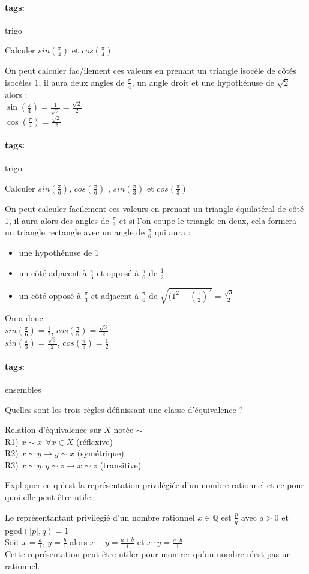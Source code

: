 \documentclass[12pt]{article}
\newcommand*{\xfield}[1]{\begin{mdframed}\centering #1\end{mdframed}\bigskip}
\newenvironment{note}{}{}
\newcommand*{\tags}[1]{\paragraph{tags: }#1}
\begin{document}
\begin{note}
	\tags{trigo}
	\xfield{Calculer $sin(\frac{\pi}{4})$ et $cos(\frac{\pi}{4})$}
	\xfield{On peut calculer fac/ilement ces valeurs en prenant un triangle isocèle de côtés isocèles 1, il aura deux angles de $\frac{\pi}{4}$, un angle droit et une hypothénuse de $\sqrt{2}$ alors : \\
	$\sin(\frac{\pi}{4}) = \frac{1}{\sqrt{2}} = \frac{\sqrt{2}}{2}$\\
	$\cos(\frac{\pi}{4}) = \frac{\sqrt{2}}{2}$}
\end{note}
\begin{note}
	\tags{trigo}
	\xfield{Calculer
$sin(\frac{\pi}{6})$,  $cos(\frac{\pi}{6})$ , $sin(\frac{\pi}{3})$ et $cos(\frac{\pi}{3})$}
	\xfield{On peut calculer facilement ces valeurs en prenant un triangle équilatéral de côté 1, il aura alors des angles de $\frac{\pi}{3}$ et si l'on coupe le triangle en deux, cela formera un triangle rectangle avec un angle de $\frac{\pi}{6}$ qui aura :
	\begin{itemize}
	\item une hypothénuse de 1
	\item  un côté adjacent à $\frac{\pi}{3}$ et opposé à $\frac{\pi}{6}$ de $\frac{1}{2}$
	\item un côté opposé à $\frac{\pi}{3}$ et adjacent à $\frac{\pi}{6}$ de $\sqrt{(1^2-(\frac{1}{2})^2} = \frac{\sqrt{3}}{2}$
	\end{itemize}
	On a donc :\\
	$sin(\frac{\pi}{6}) = \frac{1}{2}$, $cos(\frac{\pi}{6}) = \frac{\sqrt{3}}{2}$ \\
	$sin(\frac{\pi}{3}) = \frac{\sqrt{3}}{2}$, $cos(\frac{\pi}{3}) = \frac{1}{2}$}
\end{note}
\begin{note}
	\tags{ensembles}
	\xfield{Quelles sont les trois règles définissant une classe d'équivalence ?}
	\xfield{Relation d'équivalence sur $X$ notée $\sim$ \\
	R1) $x \sim x\ \ \forall x \in X$ (réflexive)\\
	R2) $x \sim y \rightarrow y\sim x$ (symétrique)\\
	R3) $x \sim y,y \sim z \rightarrow x \sim z$ (transitive)}
\end{note}
\begin{note}
	\xfield{Expliquer ce qu'est la représentation privilégiée d'un nombre rationnel et ce pour quoi elle peut-être utile.}
	\xfield{Le représentantant privilégié d'un nombre rationnel $x \in \mathbb{Q}$ est $\frac{p}{q}$ avec $q > 0$ et pgcd$(\lvert p \lvert,q) = 1$\\
	Soit $x = \frac{a}{1}$, $y = \frac{b}{1}$ alors $x+y = \frac{a+b}{1}$ et $x \cdot y = \frac{a\cdot b}{1}$\\
	Cette représentation peut être utiler pour montrer qu'un nombre n'est pas un rationnel.}
\end{note}
\end{document}
